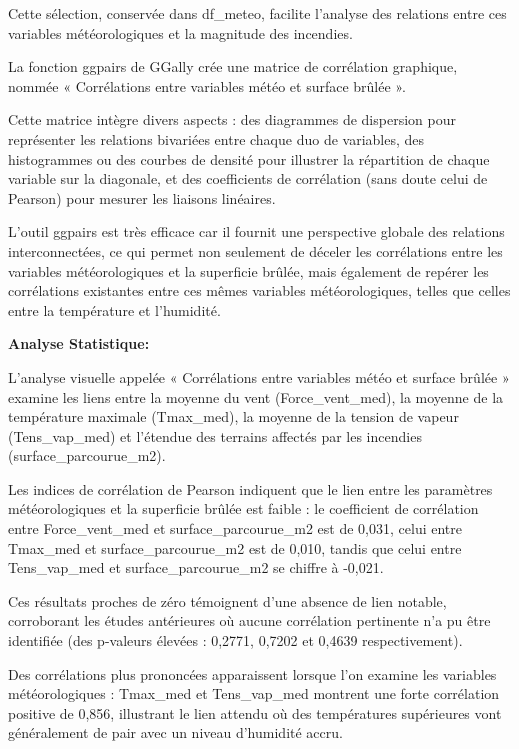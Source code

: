 \documentclass[
]{article}
\begin{document}
Cette sélection, conservée dans df\_meteo, facilite l'analyse des
relations entre ces variables météorologiques et la magnitude des
incendies.

La fonction ggpairs de GGally crée une matrice de corrélation graphique,
nommée « Corrélations entre variables météo et surface brûlée ».

Cette matrice intègre divers aspects : des diagrammes de dispersion pour
représenter les relations bivariées entre chaque duo de variables, des
histogrammes ou des courbes de densité pour illustrer la répartition de
chaque variable sur la diagonale, et des coefficients de corrélation
(sans doute celui de Pearson) pour mesurer les liaisons linéaires.

L'outil ggpairs est très efficace car il fournit une perspective globale
des relations interconnectées, ce qui permet non seulement de déceler
les corrélations entre les variables météorologiques et la superficie
brûlée, mais également de repérer les corrélations existantes entre ces
mêmes variables météorologiques, telles que celles entre la température
et l'humidité.

\textbf{Analyse Statistique:}

L'analyse visuelle appelée « Corrélations entre variables météo et
surface brûlée » examine les liens entre la moyenne du vent
(Force\_vent\_med), la moyenne de la température maximale (Tmax\_med),
la moyenne de la tension de vapeur (Tens\_vap\_med) et l'étendue des
terrains affectés par les incendies (surface\_parcourue\_m2).

Les indices de corrélation de Pearson indiquent que le lien entre les
paramètres météorologiques et la superficie brûlée est faible : le
coefficient de corrélation entre Force\_vent\_med et
surface\_parcourue\_m2 est de 0,031, celui entre Tmax\_med et
surface\_parcourue\_m2 est de 0,010, tandis que celui entre
Tens\_vap\_med et surface\_parcourue\_m2 se chiffre à -0,021.

Ces résultats proches de zéro témoignent d'une absence de lien notable,
corroborant les études antérieures où aucune corrélation pertinente n'a
pu être identifiée (des p-valeurs élevées : 0,2771, 0,7202 et 0,4639
respectivement).

Des corrélations plus prononcées apparaissent lorsque l'on examine les
variables météorologiques : Tmax\_med et Tens\_vap\_med montrent une
forte corrélation positive de 0,856, illustrant le lien attendu où des
températures supérieures vont généralement de pair avec un niveau
d'humidité accru.
\end{document}
